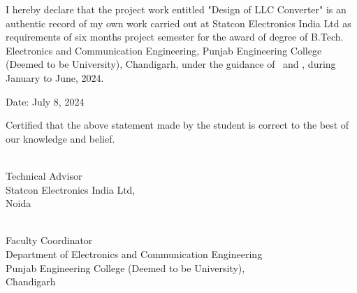 I hereby declare that the project work entitled "Design of LLC Converter" is
an authentic record of my own work carried out at Statcon Electronics India Ltd
as requirements of six months project semester for the award of degree of
B.Tech. Electronics and Communication Engineering, Punjab Engineering College (Deemed
to be University), Chandigarh, under the guidance of \industry\ and \faculty, during
January to June, 2024.

\vspace*{3cm}
\noindent
\begin{minipage}[t]{0.5\textwidth}
    \raggedright
    {Date: {July 8, 2024}}
\end{minipage}
\hfill
\begin{minipage}[t]{0.5\textwidth}
    \raggedleft{
        \name \\
        \sid
    }

\end{minipage}
\vfill

\noindent
Certified that the above statement made by the student is correct to the best of our knowledge and belief.

\vspace*{2cm}

\noindent
\begin{minipage}[t]{0.4\textwidth}
    \raggedright
    \industry \\
    Technical Advisor\\
    Statcon Electronics India Ltd,\\
    Noida

\end{minipage}
\hfill
\begin{minipage}[t]{0.55\textwidth}
    \raggedleft
    \faculty \\
    Faculty Coordinator\\
    Department of Electronics and Communication Engineering\\
    Punjab Engineering College (Deemed to be University),\\
    Chandigarh
\end{minipage}
